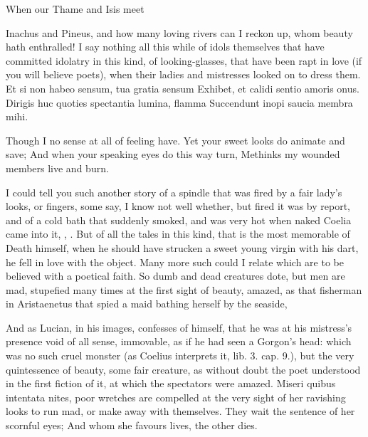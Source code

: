 {When our Thame and Isis meet

Inachus and Pineus, and how many loving rivers can I reckon up, whom
beauty hath enthralled! I say nothing all this while of idols
themselves that have committed idolatry in this kind, of
looking-glasses, that have been rapt in love (if you will believe
poets), when their ladies and mistresses looked on to dress them.
Et si non habeo sensum, tua gratia sensum
Exhibet, et calidi sentio amoris onus.
Dirigis huc quoties spectantia lumina, flamma
Succendunt inopi saucia membra mihi.

Though I no sense at all of feeling have.
Yet your sweet looks do animate and save;
And when your speaking eyes do this way turn,
Methinks my wounded members live and burn.

I could tell you such another story of a spindle that was fired by a
fair lady's looks, or fingers, some say, I know not well whether,
but fired it was by report, and of a cold bath that suddenly smoked,
and was very hot when naked Coelia came into it, , \etc{}. But of all the tales in this kind, that
is the most memorable of Death himself, when he should have
strucken a sweet young virgin with his dart, he fell in love with the
object. Many more such could I relate which are to be believed with a
poetical faith. So dumb and dead creatures dote, but men are mad,
stupefied many times at the first sight of beauty, amazed, as
that fisherman in Aristaenetus that spied a maid bathing herself by the
seaside,

And as Lucian, in his images, confesses of himself, that he was
at his mistress's presence void of all sense, immovable, as if he had
seen a Gorgon's head: which was no such cruel monster (as Coelius
interprets it, lib. 3. cap. 9.), but the very quintessence of beauty,
some fair creature, as without doubt the poet understood in the first
fiction of it, at which the spectators were amazed. Miseri quibus
intentata nites, poor wretches are compelled at the very sight of her
ravishing looks to run mad, or make away with themselves.
They wait the sentence of her scornful eyes;
And whom she favours lives, the other dies.

}
